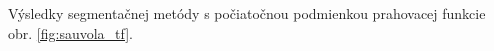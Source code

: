\documentclass[a4paper,11pt,oneside]{article}%
\begin{document}
Výsledky segmentačnej metódy s počiatočnou podmienkou prahovacej funkcie obr. \ref{fig:sauvola_tf}.

\begin{figure}[H]  
    \hspace{5px}

\end{figure}
\end{document}
